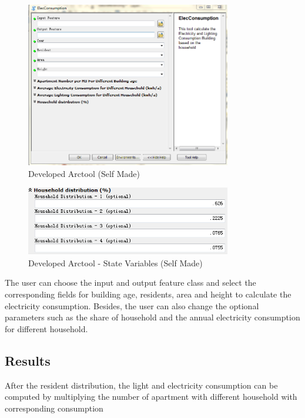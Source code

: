 \begin{figure}[ht]
	\centering
	\includegraphics[width=0.8\textwidth]{phase2/group3/fig13.png}
	\caption{Developed Arctool (Self Made)}
	\label{fig:figure13}
\end{figure}


\begin{figure}[H]
	\centering
	\includegraphics[width=0.8\textwidth]{phase2/group3/fig14.png}
	\caption{Developed Arctool - State Variables (Self Made)}
	\label{fig:figure14}
\end{figure}

The user can choose the input and output feature class and select the corresponding fields for building age, residents, area and height to calculate the electricity consumption. Besides, the user can also change the optional parameters such as the share of household and the annual electricity consumption for different household.

\subsection{Results}
After the resident distribution, the light and electricity consumption can be computed by multiplying the number of apartment with different household with corresponding consumption

